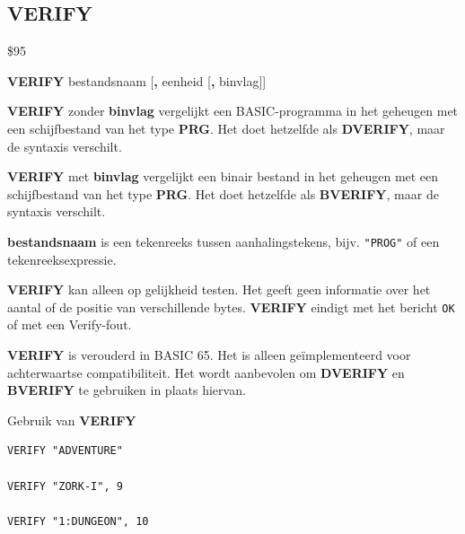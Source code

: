 \subsection{VERIFY}
\begin{description}[leftmargin=2cm,style=nextline]
\item [Token:]    \$95

\item [Formaat:]   {\bf VERIFY} bestandsnaam [{\bf,} eenheid [{\bf,} binvlag]]

\item [Gebruik:]    {\bf VERIFY} zonder {\bf binvlag} vergelijkt een BASIC-programma in het geheugen met een schijfbestand van het type {\bf PRG}. Het doet hetzelfde als {\bf DVERIFY}, maar de syntaxis verschilt.

                  {\bf VERIFY} met {\bf binvlag} vergelijkt een binair bestand in het geheugen met een schijfbestand van het type {\bf PRG}. Het doet hetzelfde als {\bf BVERIFY}, maar de syntaxis verschilt.

                  {\bf bestandsnaam} is een tekenreeks tussen aanhalingstekens, bijv. \texttt{"PROG"} of een tekenreeksexpressie.

                  \unitdefinition

\item [Opmerkingen:]  {\bf VERIFY} kan alleen op gelijkheid testen. Het geeft geen informatie over het aantal of de positie van verschillende bytes. {\bf VERIFY} eindigt met het bericht \texttt{OK} of met een Verify-fout.

                  {\bf VERIFY} is verouderd in BASIC 65. Het is alleen geïmplementeerd voor achterwaartse compatibiliteit. Het wordt aanbevolen om {\bf DVERIFY} en {\bf BVERIFY} te gebruiken in plaats hiervan.

\item [Voorbeelden:] Gebruik van {\bf VERIFY}

\begin{tcolorbox}[colback=black,coltext=white]
\verbatimfont{\codefont}
\begin{verbatim}
VERIFY "ADVENTURE"

VERIFY "ZORK-I", 9

VERIFY "1:DUNGEON", 10
\end{verbatim}
\end{tcolorbox}
\end{description}


